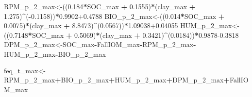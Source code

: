 \documentclass[
  10pt,
  b5paper,
]{book}
\newenvironment{Shaded}{\begin{snugshade}}{\end{snugshade}}
\newcommand{\DecValTok}[1]{\textcolor[rgb]{0.00,0.00,0.81}{#1}}
\newcommand{\FloatTok}[1]{\textcolor[rgb]{0.00,0.00,0.81}{#1}}
\newcommand{\NormalTok}[1]{#1}
\newcommand{\OperatorTok}[1]{\textcolor[rgb]{0.81,0.36,0.00}{\textbf{#1}}}
\newcommand{\StringTok}[1]{\textcolor[rgb]{0.31,0.60,0.02}{#1}}
\begin{document}
\begin{Shaded}
\begin{Highlighting}[]
{\NormalTok{RPM_p_}\DecValTok{2}\NormalTok{_max<-((}\FloatTok{0.184}\OperatorTok{*}\NormalTok{SOC_max }\OperatorTok{+}\StringTok{ }\FloatTok{0.1555}\NormalTok{)}\OperatorTok{*}\NormalTok{(clay_max }\OperatorTok{+}\StringTok{ }\FloatTok{1.275}\NormalTok{)}\OperatorTok{^}\NormalTok{(}\OperatorTok{-}\FloatTok{0.1158}\NormalTok{))}\OperatorTok{*}\FloatTok{0.9902+0.4788}
\NormalTok{BIO_p_}\DecValTok{2}\NormalTok{_max<-((}\FloatTok{0.014}\OperatorTok{*}\NormalTok{SOC_max }\OperatorTok{+}\StringTok{ }\FloatTok{0.0075}\NormalTok{)}\OperatorTok{*}\NormalTok{(clay_max }\OperatorTok{+}\StringTok{ }\FloatTok{8.8473}\NormalTok{)}\OperatorTok{^}\NormalTok{(}\FloatTok{0.0567}\NormalTok{))}\OperatorTok{*}\FloatTok{1.09038+0.04055}
\NormalTok{HUM_p_}\DecValTok{2}\NormalTok{_max<-((}\FloatTok{0.7148}\OperatorTok{*}\NormalTok{SOC_max }\OperatorTok{+}\StringTok{ }\FloatTok{0.5069}\NormalTok{)}\OperatorTok{*}\NormalTok{(clay_max }\OperatorTok{+}\StringTok{ }\FloatTok{0.3421}\NormalTok{)}\OperatorTok{^}\NormalTok{(}\FloatTok{0.0184}\NormalTok{))}\OperatorTok{*}\FloatTok{0.9878-0.3818}
\NormalTok{DPM_p_}\DecValTok{2}\NormalTok{_max<-SOC_max}\OperatorTok{-}\NormalTok{FallIOM_max}\OperatorTok{-}\NormalTok{RPM_p_}\DecValTok{2}\NormalTok{_max}\OperatorTok{-}\NormalTok{HUM_p_}\DecValTok{2}\NormalTok{_max}\OperatorTok{-}\NormalTok{BIO_p_}\DecValTok{2}\NormalTok{_max}

\NormalTok{feq_t_max<-RPM_p_}\DecValTok{2}\NormalTok{_max}\OperatorTok{+}\NormalTok{BIO_p_}\DecValTok{2}\NormalTok{_max}\OperatorTok{+}\NormalTok{HUM_p_}\DecValTok{2}\NormalTok{_max}\OperatorTok{+}\NormalTok{DPM_p_}\DecValTok{2}\NormalTok{_max}\OperatorTok{+}\NormalTok{FallIOM_max}

}
\end{Highlighting}
\end{Shaded}
\end{document}
